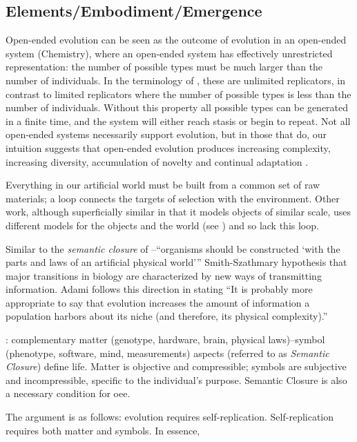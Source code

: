 \subsection{Elements/Embodiment/Emergence}
\begin{NOTES}
Open-ended evolution can be seen as the outcome of evolution in an open-ended system (\eg Chemistry), where an open-ended system has effectively unrestricted representation: the number of possible types must be much larger than the number of individuals. In the terminology of \cite{Szathmary:2006ty}, these are unlimited replicators, in contrast to limited replicators where the number of possible types is less than the number of individuals. Without this property all possible types can be generated in a finite time, and the system will either reach stasis or begin to repeat. Not all open-ended systems necessarily support evolution, but in those that do, our intuition suggests that open-ended evolution produces increasing complexity, increasing diversity, accumulation of novelty and continual adaptation \parencite{Lehman2012}.

Everything in our artificial world must be built from a common set of raw materials; a loop connects the targets of selection with the environment. Other work, although superficially similar in that it models objects of similar scale, uses different models for the objects and the world (see \parencite{Sanchez-Dehesa:2008uq}) and so lack this loop.

Similar to the \emph{semantic closure} of \cite{Pattee1995a}--``organisms should be constructed `with the parts and laws of an artificial physical world''' \cite{Taylor2001}
Smith-Szathmary hypothesis that major transitions in biology are characterized by new ways of transmitting information. Adami follows this direction in stating ``It is probably more appropriate to say that evolution increases the amount of information a population harbors about its niche (and therefore, its physical complexity).'' \cite{Adami2002}

\cite{Pattee1995a}: complementary matter (\eg genotype, hardware, brain, physical laws)--symbol (\eg phenotype, software, mind, measurements) aspects (referred to as \textit{Semantic Closure}) define life. Matter is objective and compressible; symbols are subjective and incompressible, specific to the individual's purpose. Semantic Closure is also a necessary condition for \gls{oee}. \Textcite{VonNeumann1966}

The argument is as follows: evolution requires self-replication. Self-replication requires both matter and symbols. In essence,  


\end{NOTES}
